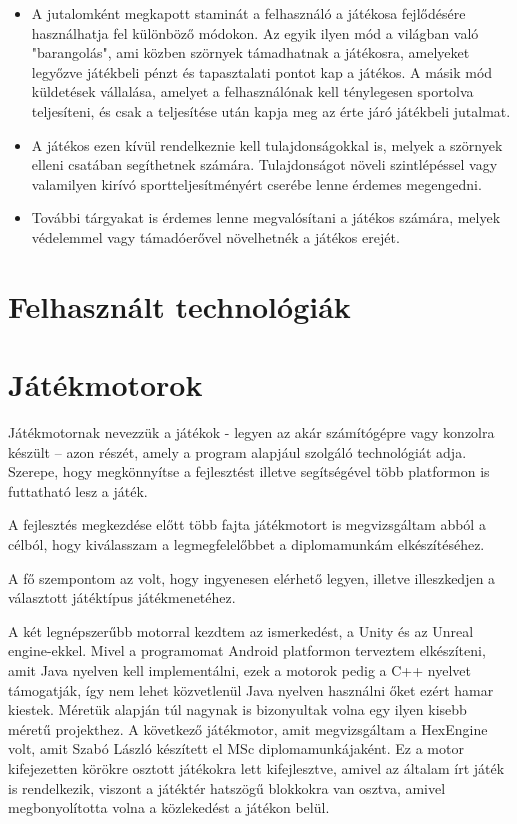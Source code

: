 \begin{itemize}
	\item A jutalomként megkapott staminát a felhasználó a játékosa fejlődésére használhatja fel különböző módokon. Az egyik ilyen mód a világban való "barangolás", ami közben szörnyek támadhatnak a játékosra, amelyeket legyőzve játékbeli pénzt és tapasztalati pontot kap a játékos. A másik mód küldetések vállalása, amelyet a felhasználónak kell ténylegesen sportolva teljesíteni, és csak a teljesítése után kapja meg az érte járó játékbeli jutalmat.
	\item A játékos ezen kívül rendelkeznie kell tulajdonságokkal is, melyek a szörnyek elleni csatában segíthetnek számára. Tulajdonságot növeli szintlépéssel vagy valamilyen kirívó sportteljesítményért cserébe lenne érdemes megengedni.
	\item További tárgyakat is érdemes lenne megvalósítani a játékos számára, melyek védelemmel vagy támadóerővel növelhetnék a játékos erejét.
\end{itemize}


\section{Felhasznált technológiák}
\label{resz3_2}

\section*{Játékmotorok}
\label{resz3_2_1}

Játékmotornak nevezzük a játékok - legyen az akár számítógépre vagy konzolra készült – azon részét, amely a program alapjául szolgáló technológiát adja. Szerepe, hogy megkönnyítse a fejlesztést illetve segítségével több platformon is futtatható lesz a játék.

A fejlesztés megkezdése előtt több fajta játékmotort is megvizsgáltam abból a célból, hogy kiválasszam a legmegfelelőbbet a diplomamunkám elkészítéséhez. 

A fő szempontom az volt, hogy ingyenesen elérhető legyen, illetve illeszkedjen a választott játéktípus játékmenetéhez.

A két legnépszerűbb motorral kezdtem az ismerkedést, a Unity és az Unreal engine-ekkel. Mivel a programomat Android platformon terveztem elkészíteni, amit Java nyelven kell implementálni, ezek a motorok pedig a C++ nyelvet támogatják, így nem lehet közvetlenül Java nyelven használni őket ezért hamar kiestek. Méretük alapján túl nagynak is bizonyultak volna egy ilyen kisebb méretű projekthez. A következő játékmotor, amit megvizsgáltam a HexEngine volt, amit Szabó László készített el MSc diplomamunkájaként. Ez a motor kifejezetten körökre osztott játékokra lett kifejlesztve, amivel az általam írt játék is rendelkezik, viszont a játéktér hatszögű blokkokra van osztva, amivel megbonyolította volna a közlekedést a játékon belül.

